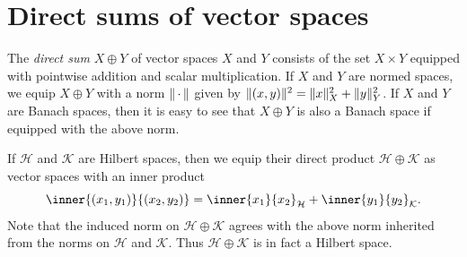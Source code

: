 \documentclass[article, a4paper, 11pt, oneside]{memoir}
\makeatletter
\let\phi\varphi
\numberwithin{equation}{chapter}
\newcommand{\calH}{\mathcal{H}}
\newcommand{\calK}{\mathcal{K}}
\theoremstyle{myexample}
\theoremstyle{myexample}
\theoremstyle{myexamplebreak}
\theoremstyle{myexamplebreak}
\theoremstyle{nonumberplain}
\newtheorem{proof}{\protect\@proof}
\theoremstyle{MyNonumberplain}
\newcommand{\@proof}{}
\renewcommand{\@proof}{Proof}%
\renewcommand{\@proof}{Bevis}%
\makeatother
\begin{document}




\section{Direct sums of vector spaces}

The \emph{direct sum} $X \oplus Y$ of vector spaces $X$ and $Y$ consists of the set $X \times Y$ equipped with pointwise addition and scalar multiplication. If $X$ and $Y$ are normed spaces, we equip $X \oplus Y$ with a norm $\lVert\,\cdot\,\rVert$ given by $\lVert(x,y)\rVert^2 = \lVert x\rVert_X^2 + \lVert y\rVert_Y^2$. If $X$ and $Y$ are Banach spaces, then it is easy to see that $X \oplus Y$ is also a Banach space if equipped with the above norm.

If $\calH$ and $\calK$ are Hilbert spaces, then we equip their direct product $\calH \oplus \calK$ as vector spaces with an inner product
%
\begin{equation*}
    \inner{(x_1, y_1)}{(x_2, y_2)}
        = \inner{x_1}{x_2}_\calH + \inner{y_1}{y_2}_\calK.
\end{equation*}
%
Note that the induced norm on $\calH \oplus \calK$ agrees with the above norm inherited from the norms on $\calH$ and $\calK$. Thus $\calH \oplus \calK$ is in fact a Hilbert space.
\end{document}
